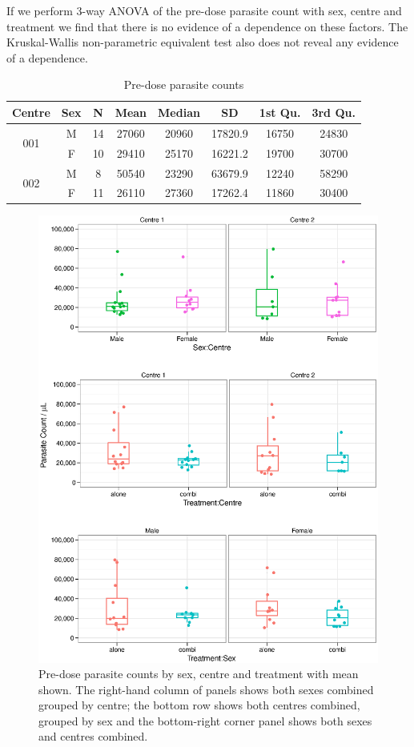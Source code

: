 If we perform 3-way ANOVA of the pre-dose parasite count with sex, centre and treatment we find that there is no evidence of a dependence on these factors. The Kruskal-Wallis non-parametric equivalent test also does not reveal any evidence of a dependence. 
\begin{table}[h]
\centering
\caption{Pre-dose parasite counts}\label{predose}
\begin{tabular}{|cc|cccccc|}
\hline
Centre&Sex&N&Mean&Median&SD&1st Qu.&3rd Qu.\\\hline
\multirow{2}{*}{001}&M&14&27060&20960&17820.9&16750&24830\\
&F&10&29410&25170&16221.2&19700&30700\\\hline
\multirow{3}{*}{002}&M&8&50540&23290&63679.9&12240&58290\\
&F&11&26110&27360&17262.4&11860&30400\\\hline
\end{tabular}
\end{table}
\begin{figure}
\begin{center}
\includegraphics[width=6.1in]{preaov.eps}
\caption{Pre-dose parasite counts by sex, centre and treatment with mean shown. The right-hand column of panels shows both sexes combined grouped by centre; the bottom row shows both centres combined, grouped by sex and the bottom-right corner panel shows both sexes and centres combined.}
\label{preaov}
\end{center}
\end{figure}
